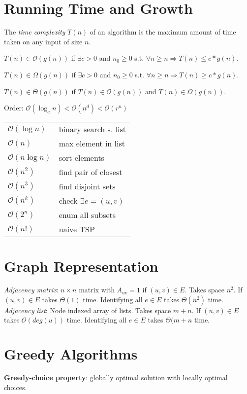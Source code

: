 \section*{Running Time and Growth}
The \textit{time complexity} $T(n)$ of an algorithm is the maximum amount of time taken on any input of size $n$.

$T(n) \in \mathcal{O}(g(n))$ if $\exists c > 0$ and $n_0 \geq 0$ s.t. $\forall n \geq n \Rightarrow T(n) \leq c *g(n)$.

$T(n) \in \Omega (g(n))$ if $\exists c > 0$ and $n_0 \geq 0$ s.t. $\forall n \geq n \Rightarrow T(n) \geq c *g(n)$.

$T(n) \in \Theta (g(n))$ if $T(n) \in \mathcal{O}(g(n))$ and  $T(n) \in \Omega (g(n))$. 

Order: $\mathcal{O}(\log_a n) < \mathcal{O}(n^d) < \mathcal{O}(r^n)$

\begin{tabular}{|l|l|}
\hline
$\mathcal{O}(\log n)$ & binary search s. list \\
$\mathcal{O}(n)$ & max element in list \\
$\mathcal{O}(n \log n)$ & sort elements \\
$\mathcal{O}(n^2)$ & find pair of closest \\
$\mathcal{O}(n^3 )$ & find disjoint sets \\
$\mathcal{O}(n^k)$ & check $\exists e = (u,v)$\\
$\mathcal{O}(2^n)$ & enum all subsets \\
$\mathcal{O}(n!)$ & naive TSP \\
\hline
\end{tabular}

\section*{Graph Representation}
\textit{Adjacency matrix}: $n \times n$ matrix with $A_{uv} = 1$ if $(u,v) \in E$. 
Takes space $n^2$. 
If $(u,v) \in E$ takes $\Theta(1)$ time. 
Identifying all $e \in E$ takes $\Theta(n^2)$ time. 
\textit{Adjacency list}: Node indexed array of lists. 
Takes space $m + n$.
If $(u,v) \in E$ takes $\mathcal{O}(deg(u))$ time.
Identifying all $e \in E$ takes $\Theta(m + n$ time. 

\section*{Greedy Algorithms}
\textbf{Greedy-choice property}: globally optimal solution with locally optimal choices. 


